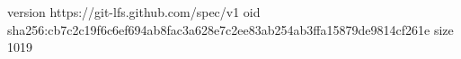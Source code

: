 version https://git-lfs.github.com/spec/v1
oid sha256:cb7c2c19f6c6ef694ab8fac3a628e7c2ee83ab254ab3ffa15879de9814cf261e
size 1019
